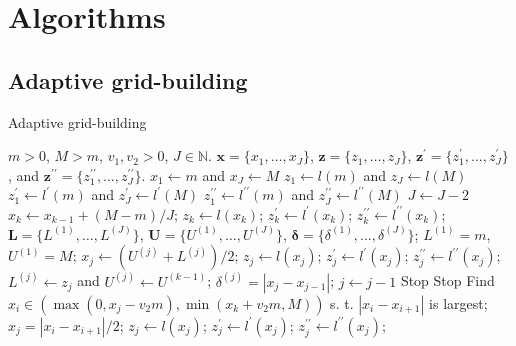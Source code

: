 \section{Algorithms}

\subsection{Adaptive grid-building}

\begin{algorithm}[H]
    \caption{Adaptive grid-building}
    \label{alg:bisection-type}
    \begin{algorithmic}
    \Require $m> 0$, $M>m$, $v_1, v_2 > 0$, $J \in \mathbb{N}$.
      \State $\boldsymbol{x} = \{x_1, \ldots, x_J\}$, $\boldsymbol{z} = \{z_1, \ldots, z_J\}$, $\boldsymbol{z^\prime} = \{z_1^\prime, \ldots, z_J^\prime\}$,  and $\boldsymbol{z^{\prime\prime}} = \{z_1^{\prime\prime}, \ldots, z_J^{\prime\prime}\}$.
    \EndProcedure
    \State $x_1 \gets m$ and $x_J \gets M$
    \State $z_1 \gets l(m)$ and $z_J \gets l(M)$
    \State $z_1^\prime \gets l^\prime(m)$ and $z_J^\prime \gets l^\prime(M)$
    \State $z_1^{\prime\prime} \gets l^{\prime\prime}(m)$ and $z_J^{\prime\prime} \gets l^{\prime\prime}(M)$
    \State $J  \gets J-2$
     
    \State $x_k \gets x_{k-1} + (M-m)/J$;
    \State $z_k \gets l(x_k)$;
    \State $z_k^\prime \gets l^\prime(x_k)$;
    \State $z_k^{\prime\prime} \gets l^{\prime\prime}(x_k)$;
    \EndFor
     
      \State $\boldsymbol{L} = \{L^{(1)}, \ldots, L^{(J)}\}$, $\boldsymbol{U} = \{U^{(1)}, \ldots, U^{(J)}\}$, $\boldsymbol{\delta} = \{\delta^{(1)}, \ldots, \delta^{(J)}\}$;
      \State $L^{(1)} = m$, $U^{(1)} = M$;
     \EndProcedure
        \State $x_j \gets (U^{(j)} + L^{(j)})/2$;
        \State $z_j \gets l(x_j)$;
        \State $z_j^\prime \gets l^\prime(x_j)$;
        \State $z_j^{\prime\prime} \gets l^{\prime\prime}(x_j)$;
        \State $L^{(j)} \gets z_j$ and $U^{(j)} \gets U^{(k-1)}$;
        \EndIf
        \State $\delta^{(j)} = |x_{j} - x_{j-1}|$;
        \State $j \gets j -1$
         Stop
         Stop
        \Else \: Find $x_i \in \left(\max(0, x_j-v_2m), \min(x_k + v_2m, M) \right)$ s. t. $|x_i-x_{i+1}|$ is largest;
        \State $x_j = |x_i - x_{i+1}|/2$;
        \State $z_j \gets l(x_j)$;
        \State $z_j^\prime \gets l^\prime(x_j)$;
        \State $z_j^{\prime\prime} \gets l^{\prime\prime}(x_j)$;
        \EndIf
       \EndFor
    \EndIf
    \end{algorithmic}
\end{algorithm}